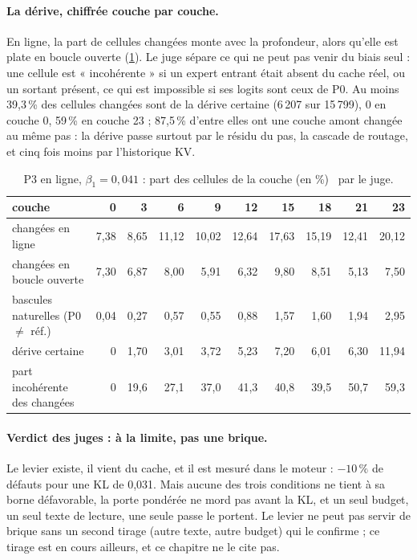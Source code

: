 \paragraph{La dérive, chiffrée couche par couche.} En ligne, la part de cellules changées monte avec la profondeur, alors qu'elle est plate en boucle ouverte (\cref{t3mim:tab:p3-derive}). Le juge sépare ce qui ne peut pas venir du biais seul : une cellule est « incohérente » si un expert entrant était absent du cache réel, ou un sortant présent, ce qui est impossible si ses logits sont ceux de P0. Au moins 39,3\,\% des cellules changées sont de la dérive certaine (6\,207 sur 15\,799), 0 en couche 0, 59\,\% en couche 23 ; 87,5\,\% d'entre elles ont une couche amont changée au même pas : la dérive passe surtout par le résidu du pas, la cascade de routage, et cinq fois moins par l'historique KV.

\begin{table}[tbp]
\centering\small
\caption[P3 en ligne : la dérive par couche]{P3 en ligne, $\beta_1 = 0{,}041$ : part des cellules de la couche (en \%) \mes~par le juge.}
\label{t3mim:tab:p3-derive}
\setlength{\tabcolsep}{4.2pt}
\begin{tabular}{@{}lrrrrrrrrr@{}}
\toprule
couche & 0 & 3 & 6 & 9 & 12 & 15 & 18 & 21 & 23 \\
\midrule
changées en ligne & 7,38 & 8,65 & 11,12 & 10,02 & 12,64 & 17,63 & 15,19 & 12,41 & 20,12 \\
changées en boucle ouverte & 7,30 & 6,87 & 8,00 & 5,91 & 6,32 & 9,80 & 8,51 & 5,13 & 7,50 \\
bascules naturelles (P0 $\ne$ réf.) & 0,04 & 0,27 & 0,57 & 0,55 & 0,88 & 1,57 & 1,60 & 1,94 & 2,95 \\
dérive certaine & 0 & 1,70 & 3,01 & 3,72 & 5,23 & 7,20 & 6,01 & 6,30 & 11,94 \\
part incohérente des changées & 0 & 19,6 & 27,1 & 37,0 & 41,3 & 40,8 & 39,5 & 50,7 & 59,3 \\
\bottomrule
\end{tabular}
\end{table}

\paragraph{Verdict des juges : à la limite, pas une brique.} Le levier existe, il vient du cache, et il est mesuré dans le moteur : $-10\,\%$ de défauts pour une KL de 0,031. Mais aucune des trois conditions ne tient à sa borne défavorable, la porte pondérée ne mord pas avant la KL, et un seul budget, un seul texte de lecture, une seule passe le portent. Le levier ne peut pas servir de brique sans un second tirage (autre texte, autre budget) qui le confirme ; ce tirage est en cours ailleurs, et ce chapitre ne le cite pas.

